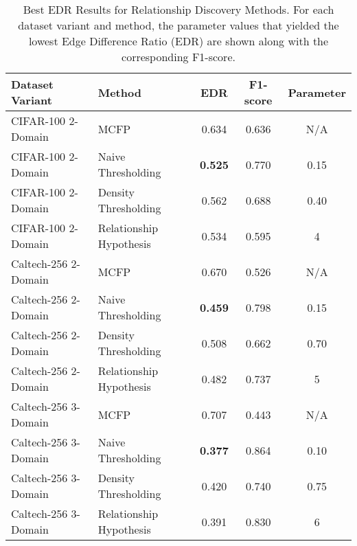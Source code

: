 \begin{table}[ht]
\centering
\caption{Best EDR Results for Relationship Discovery Methods. For each dataset variant and method, the parameter values that yielded the lowest Edge Difference Ratio (EDR) are shown along with the corresponding F1-score.}
\label{tab:relationship_methods_best_edr}
\begin{tabular}{llccc}
\toprule
Dataset Variant & Method & EDR & F1-score & Parameter \\
\midrule
CIFAR-100 2-Domain & MCFP & 0.634 & 0.636 & N/A \\
CIFAR-100 2-Domain & Naive Thresholding & \textbf{0.525} & 0.770 & 0.15 \\
CIFAR-100 2-Domain & Density Thresholding & 0.562 & 0.688 & 0.40 \\
CIFAR-100 2-Domain & Relationship Hypothesis & 0.534 & 0.595 & 4 \\
\hline
Caltech-256 2-Domain & MCFP & 0.670 & 0.526 & N/A \\
Caltech-256 2-Domain & Naive Thresholding & \textbf{0.459} & 0.798 & 0.15 \\
Caltech-256 2-Domain & Density Thresholding & 0.508 & 0.662 & 0.70 \\
Caltech-256 2-Domain & Relationship Hypothesis & 0.482 & 0.737 & 5 \\
\hline
Caltech-256 3-Domain & MCFP & 0.707 & 0.443 & N/A \\
Caltech-256 3-Domain & Naive Thresholding & \textbf{0.377} & 0.864 & 0.10 \\
Caltech-256 3-Domain & Density Thresholding & 0.420 & 0.740 & 0.75 \\
Caltech-256 3-Domain & Relationship Hypothesis & 0.391 & 0.830 & 6 \\
\bottomrule
\end{tabular}
\end{table}
